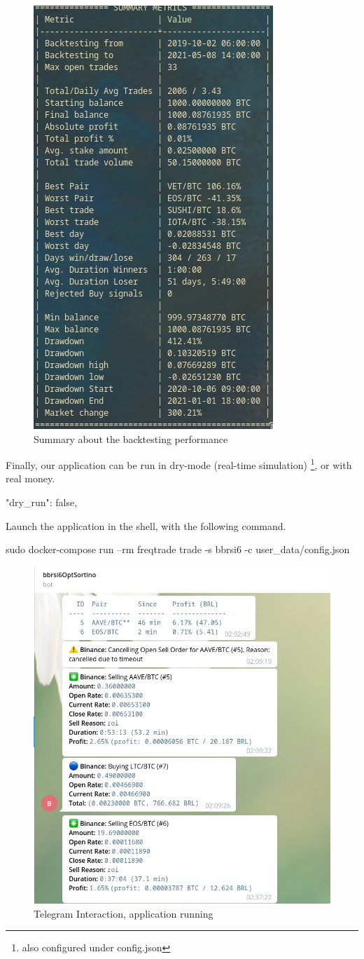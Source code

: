 \documentclass[
12pt,				%
openright,			%
oneside,			%
a4paper,			%
brazil,				%
english,			  %
]{abntex2}
\begin{document}
\begin{figure}[ht]
  \centering
    \caption{\label{fig:freqtrade-running} Summary about the backtesting performance}
  \includegraphics[width=0.3\linewidth]{Imagens/freqtrade5.jpeg}
\end{figure}

Finally, our application can be run in dry-mode (real-time simulation) \footnote{also configured under config.json}, or with real money.

\begin{python}
"dry_run": false,
\end{python}

Launch the application in the shell, with the following command.
\begin{shell}
sudo docker-compose run --rm freqtrade trade -s bbrsi6 -c user_data/config.json
\end{shell}

\begin{figure}[ht]
  \centering
    \caption{\label{fig:freqtrade-running} Telegram Interaction, application running}
    \includegraphics[width=0.45\linewidth]{Imagens/freqtrade1.jpeg}
\end{figure}
\end{document}
